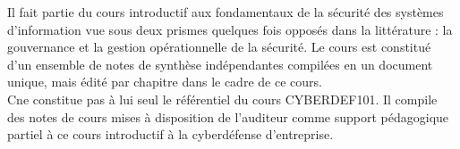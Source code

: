 

Il fait partie du cours introductif aux fondamentaux de la sécurité des systèmes d'information vue sous deux prismes quelques fois opposés dans la littérature : la gouvernance et la gestion opérationnelle de la sécurité.
Le cours est constitué d'un ensemble de notes de synthèse indépendantes compilées en un document unique, mais édité par chapitre dans le cadre de ce cours.\\
C\edoc ne constitue pas à lui seul le référentiel du cours CYBERDEF101. Il compile des notes de cours mises à disposition de l'auditeur comme support pédagogique partiel à ce cours introductif à la cyberdéfense d'entreprise.